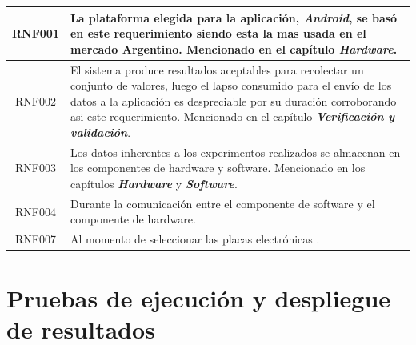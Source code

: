 \begin{longtable}{|p{3cm}|p{11cm}|}
        \hline
        \multicolumn{1}{|c|}{RNF001} & La plataforma elegida para la aplicación, \textit{Android},  se basó en este requerimiento siendo esta la mas usada en el mercado Argentino. Mencionado en el capítulo \textit{\textbf{Hardware}}. \\
        \hline
        \multicolumn{1}{|c|}{RNF002} & El sistema produce resultados aceptables para recolectar un conjunto de valores, luego el lapso consumido para el envío de los datos a la aplicación es despreciable por su duración corroborando asi este requerimiento. Mencionado en el capítulo \textit{\textbf{Verificación y validación}}. \\
        \hline
        \multicolumn{1}{|c|}{RNF003} & Los datos inherentes a los experimentos realizados se almacenan en los componentes de hardware y software. Mencionado en los capítulos \textit{\textbf{Hardware}} y \textit{\textbf{Software}}. \\
        \hline
        \multicolumn{1}{|c|}{RNF004} & Durante la comunicación entre el componente de software y el componente de hardware.\\
        \multicolumn{1}{|c|}{RNF007} & Al momento de seleccionar las placas electrónicas .\\
        \hline
    \end{longtable}

\section{Pruebas de ejecución y despliegue de resultados}

